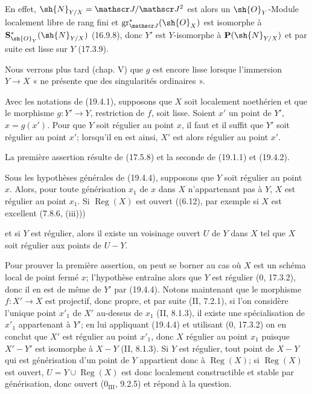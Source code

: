 En effet, $\sh{N}_{Y/X}=\mathscr J/\mathscr J^2$ est alors un $\sh{O}_Y$-Module localement libre de rang fini et $\operatorname{gr}_{\mathscr J}^*(\sh{O}_X)$ est isomorphe à $\mathbf S_{\sh{O}_Y}^*(\sh{N}_{Y/X})$ (16.9.8), donc $Y'$ est $Y$-isomorphe à $\mathbf P(\sh{N}_{Y/X})$ et par suite est lisse sur $Y$ (17.3.9).

Nous verrons plus tard (chap. V) que $g$ est encore lisse lorsque l'immersion $Y\to X$ « ne présente que des singularités ordinaires ».

\begin{proposition}[19.4.4]
\label{IV.19.4.4}
Avec les notations de (19.4.1), supposons que $X$ soit localement noethérien et que le morphisme $g:Y'\to Y$, restriction de $f$, soit lisse. Soient $x'$ un point de $Y'$, $x=g(x')$. Pour que $Y$ soit régulier au point $x$, il faut et il suffit que $Y'$ soit régulier au point $x'$; lorsqu'il en est ainsi, $X'$ est alors régulier au point $x'$.
\end{proposition}

La première assertion résulte de (17.5.8) et la seconde de (19.1.1) et (19.4.2).

\begin{corollary}[19.4.5]
\label{IV.19.4.5}
Sous les hypothèses générales de (19.4.4), supposons que $Y$ soit régulier au point $x$. Alors, pour toute générisation $x_1$ de $x$ dans $X$ n'appartenant pas à $Y$, $X$ est régulier au point $x_1$. Si $\operatorname{Reg}(X)$ est ouvert ((6.12), par exemple si $X$ est excellent (7.8.6, (iii)))


et si $Y$ est régulier, alors il existe un voisinage ouvert $U$ de $Y$ dans $X$ tel que $X$ soit régulier aux points de $U-Y$.
\end{corollary}

Pour prouver la première assertion, on peut se borner au cas où $X$ est un schéma local de point fermé $x$; l'hypothèse entraîne alors que $Y$ est régulier ($0$, 17.3.2), donc il en est de même de $Y'$ par (19.4.4). Notons maintenant que le morphisme $f:X'\to X$ est projectif, donc propre, et par suite (II, 7.2.1), si l'on considère l'unique point $x'_1$ de $X'$ au-dessus de $x_1$ (II, 8.1.3), il existe une spécialisation de $x'_1$ appartenant à $Y'$; en lui appliquant (19.4.4) et utilisant ($0$, 17.3.2) on en conclut que $X'$ est régulier au point $x'_1$, donc $X$ régulier au point $x_1$ puisque $X'-Y'$ est isomorphe à $X-Y$ (II, 8.1.3). Si $Y$ est régulier, tout point de $X-Y$ qui est générisation d'un point de $Y$ appartient donc à $\operatorname{Reg}(X)$; si $\operatorname{Reg}(X)$ est ouvert, $U=Y\cup\operatorname{Reg}(X)$ est donc localement constructible et stable par générisation, donc ouvert ($0_{\mathrm{III}}$, 9.2.5) et répond à la question.

